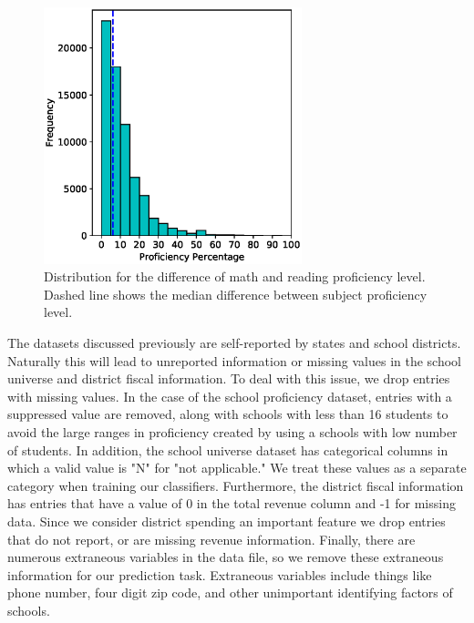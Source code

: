 \begin{figure} 
	\includegraphics[width=7.5cm]{images/prof_diff}
	\caption{Distribution for the difference of math and reading proficiency level. Dashed line shows the median difference between subject proficiency level.}
	\label{fig:diff}
\end{figure}

The datasets discussed previously are self-reported by states and school districts. Naturally this will lead to unreported information or missing values in the school universe and district fiscal information. To deal with this issue, we drop entries with missing values. In the case of the school proficiency dataset, entries with a suppressed value are removed, along with schools with less than 16 students to avoid the large ranges in proficiency created by using a schools with low number of students. In addition, the school universe dataset has categorical columns in which a valid value is "N" for "not applicable." We treat these values as a separate category when training our classifiers. Furthermore, the district fiscal information has entries that have a value of 0 in the total revenue column and -1 for missing data. Since we consider district spending an important feature \cite{spending2015,spending2017} we drop entries that do not report, or are missing revenue information. Finally, there are numerous extraneous variables in the data file, so we remove these extraneous information for our prediction task. Extraneous variables include things like phone number, four digit zip code, and other unimportant identifying factors of schools.

